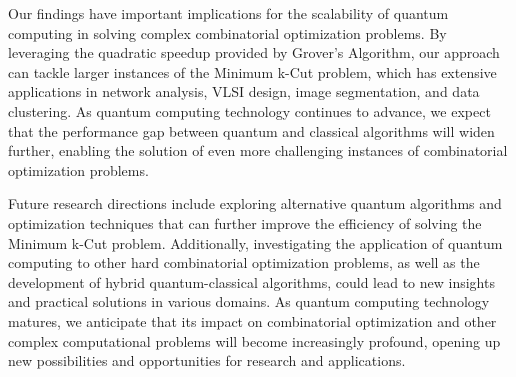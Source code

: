 Our findings have important implications for the scalability of quantum computing in solving complex combinatorial optimization problems. By leveraging the quadratic speedup provided by Grover's Algorithm, our approach can tackle larger instances of the Minimum k-Cut problem, which has extensive applications in network analysis, VLSI design, image segmentation, and data clustering. As quantum computing technology continues to advance, we expect that the performance gap between quantum and classical algorithms will widen further, enabling the solution of even more challenging instances of combinatorial optimization problems.

Future research directions include exploring alternative quantum algorithms and optimization techniques that can further improve the efficiency of solving the Minimum k-Cut problem. Additionally, investigating the application of quantum computing to other hard combinatorial optimization problems, as well as the development of hybrid quantum-classical algorithms, could lead to new insights and practical solutions in various domains. As quantum computing technology matures, we anticipate that its impact on combinatorial optimization and other complex computational problems will become increasingly profound, opening up new possibilities and opportunities for research and applications.

% 

